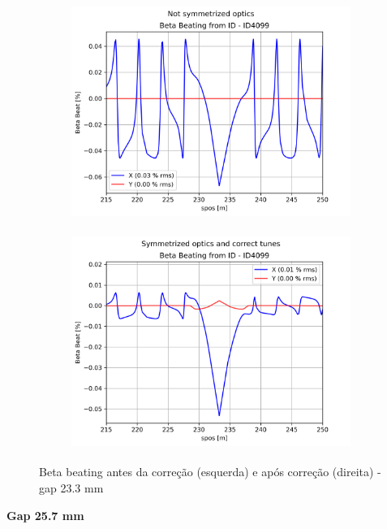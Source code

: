 \documentclass[a4paper,12pt]{article}
\begin{document}
\begin{figure}[H]
\begin{subfigure}{0.5\textwidth}
\includegraphics[width=0.9\linewidth, height=7cm]{figs/phase0 gap23 uncorrected-optics.png} 
\label{fig:subim1023}
\end{subfigure}
\begin{subfigure}{0.5\textwidth}
\includegraphics[width=0.9\linewidth, height=7cm]{figs/phase0 gap23 corrected-optics-tunes.png}
\label{fig:subim2023}
\end{subfigure}
\caption{Beta beating antes da correção (esquerda) e após correção (direita) - gap 23.3 mm}
\label{fig:bb0_23}
\end{figure}

\textbf{Gap 25.7 mm} \\
\end{document}

